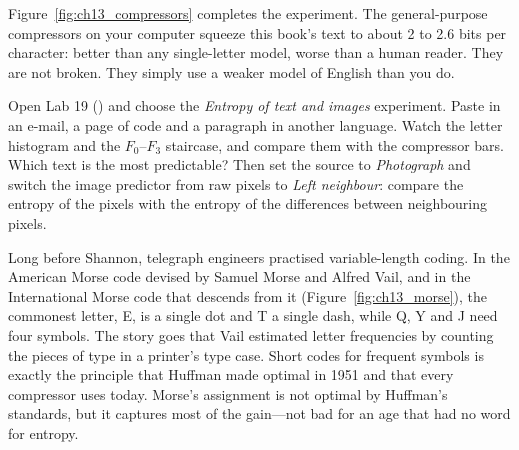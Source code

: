 
Figure~\ref{fig:ch13_compressors} completes the experiment. The general-purpose compressors on
your computer squeeze this book's text to about 2 to 2.6 bits per character: better than any
single-letter model, worse than a human reader. They are not broken. They simply use a weaker
model of English than you do.

\begin{tryit}
Open Lab 19 () and choose the \emph{Entropy of text and images}
experiment. Paste in an e-mail, a page of code and a paragraph in another language. Watch the
letter histogram and the $F_0$--$F_3$ staircase, and compare them with the compressor bars. Which
text is the most predictable? Then set the source to \emph{Photograph} and switch the image
predictor from raw pixels to \emph{Left neighbour}: compare the entropy of the pixels with the
entropy of the differences between neighbouring pixels.
\end{tryit}

\begin{inpractice}
Long before Shannon, telegraph engineers practised variable-length coding. In the American Morse
code devised by Samuel Morse and Alfred Vail, and in the International Morse code that descends
from it (Figure~\ref{fig:ch13_morse}), the commonest letter, E, is a single dot and T a single
dash, while Q, Y and J need four symbols. The story goes that Vail estimated letter frequencies
by counting the pieces of type in a printer's type case. Short codes for frequent symbols is
exactly the principle that Huffman made optimal in 1951 and that every compressor uses today.
Morse's assignment is not optimal by Huffman's standards, but it captures most of the gain---not
bad for an age that had no word for entropy.
\end{inpractice}


